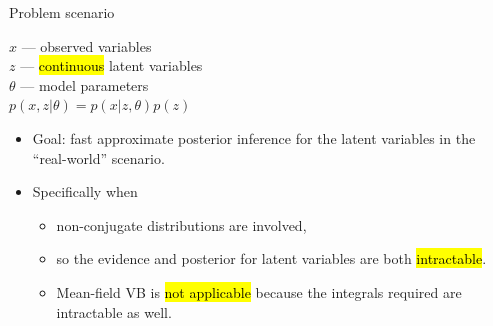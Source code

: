 \documentclass[unicode,11pt]{beamer}
\begin{document}
\begin{frame}[fragile]{Problem scenario}
  \begin{center}
    \begin{minipage}[t]{.3\linewidth}
    \end{minipage}
    \begin{minipage}[t]{.55\linewidth}
      $x$ --- observed variables\\
      $z$ --- \hl{continuous} latent variables\\
      $\theta$ --- model parameters\\
      $p(x, z|\theta) = p(x|z, \theta) p(z)$  %
    \end{minipage}
  \end{center}

  \begin{itemize}
  \item Goal: fast approximate posterior inference for the latent variables
    in the ``real-world'' scenario.
  \item Specifically when
    \begin{itemize}
    \item non-conjugate distributions are involved,
    \item so the evidence and posterior for latent variables are both
      \hl{intractable}.
    \item Mean-field VB is \hl{not applicable} because the integrals
      required are intractable as well.
    \end{itemize}
  \end{itemize}

\end{frame}
\end{document}
